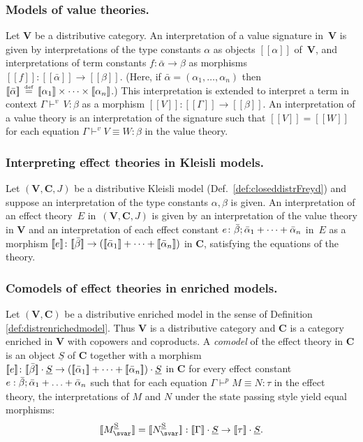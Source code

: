 \documentclass{LMCS}
\newcommand{\veq}[4]{#1 \mathrel{\vdash^{v}} #2\equiv #3 \colon \! #4}
\newcommand{\peq}[4]{#1 \mathrel{\vdash^p} #2\equiv #3 \colon \! #4}
\newcommand{\ltj}[3]{#1 \vdash^v \, #2 \colon \! #3}
\newcommand{\co}{\colon}
\renewcommand{\vec}[1]{\bar{#1}}
\newcommand{\VCat}{\fixedcatfont{V}} \newcommand{\CCat}{\fixedcatfont{C}} \newcommand{\DCat}{\fixedcatfont{D}}
\newcommand{\ltensor}[2]{#1 \cdot #2}
\newcommand{\fixedcatfont}{\mathbf}
\newcommand{\denlb}{[\![}
\newcommand{\denrb}{]\!]}
\newcommand{\den}[1]{\denlb{#1}\denrb}
\newcommand{\stateobj}{{\underline{S}}}
\newcommand{\defeq}{\mathrel{\,\stackrel{\mbox{\tiny{$\mathrm{def}$}}}=\,}}
\begin{document}
\subsubsection{Models of value theories.}
\label{sec:modelvaluetheories}
Let $\VCat$ be a distributive category.
An interpretation of a value signature in~$\VCat$ is given by 
interpretations of
the type constants
$\alpha$
as objects $\den\alpha$ of~$\VCat$,
and interpretations of term constants ${f \co
\vec\alpha \to \beta}$ as morphisms ${\den f \co
  \den{\vec\alpha} \to
  \den{\beta}}$.
(Here, if $\vec \alpha=(\alpha_1,\dots,\alpha_n)$ then
$\den{\vec\alpha}\defeq \den{\alpha_1}\times\dots\times\den{\alpha_n}$.)
This interpretation is extended to interpret a term in context
${\ltj{\Gamma}{V}{\beta}}$
as a morphism ${\den V\colon\den\Gamma\to\den\beta}$.
An interpretation of a value theory is an interpretation of the signature 
such that ${\den V = \den W}$ for each equation
${\veq{\Gamma}{V}{W}{\beta}}$ in the value theory.

\subsubsection{Interpreting effect theories in Kleisli models.}
\label{sec:eff-kleislimodels}
Let $(\VCat,\CCat,J)$ be a distributive Kleisli model
(Def.~\ref{def:closeddistrFreyd}) 
and suppose an interpretation of the type constants 
$\alpha,\beta$ is given.
An interpretation of an effect theory~$E$
in~$(\VCat,\CCat,J)$ 
is given by an interpretation of the value theory in $\VCat$
and 
an interpretation of each effect constant
$\geff\colon \vec \beta;\vec\alpha_1+\dots+\vec\alpha_n$ in~$E$
as a morphism 
$\den\geff\colon \den{\vec\beta}\to (\den{\vec\alpha_1}+\dots+\den{\vec\alpha_n})$ in $\CCat$,
satisfying the equations of the theory.

\subsubsection{Comodels of effect theories in enriched models.}
\label{sec:eff-ecbvmodels}
Let $(\VCat,\CCat)$ be a distributive enriched model 
in the sense of Definition \ref{def:distrenrichedmodel}.
Thus $\VCat$ is a distributive category and $\CCat$ is a category enriched
in $\VCat$ with copowers and coproducts.
A \emph{comodel} of the effect theory in $\CCat$ 
is an object $\stateobj$ of $\CCat$ 
together with a morphism
$\den\geff\colon \ltensor{\den{\vec\beta}}{\stateobj} \to \ltensor{(\den{\vec\alpha_1}+\dots+\den{\vec\alpha_n})}{\stateobj}$
in $\CCat$
for every effect constant 
$\arityj{\geff}{\vec\beta}{\vec \alpha_1 + \ldots + \vec \alpha_n}$
such that 
for each equation $\peq\Gamma M N \tau$ in the effect theory,
the interpretations of $M$ and $N$ under the state
passing style yield equal morphisms:
\[
\den{\CBVtoEECP{M}}=
\den{\CBVtoEECP{N}}:
\ltensor {\den{\Gamma}}\stateobj\to\ltensor{\den \tau}\stateobj\text.\]
\end{document}
